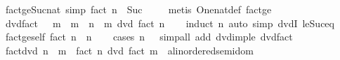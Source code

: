 \begin{isabellebody}
\endisatagproof
{\isafoldproof}%
%
\isadelimproof
\isanewline
%
\endisadelimproof
\isanewline
{}\isamarkupfalse%
\ fact{\isacharunderscore}{\kern0pt}ge{\isacharunderscore}{\kern0pt}Suc{\isacharunderscore}{\kern0pt}{}{\isacharunderscore}{\kern0pt}nat\ {\isacharbrackleft}{\kern0pt}simp{\isacharbrackright}{\kern0pt}{\isacharcolon}{\kern0pt}\ {\isachardoublequoteopen}fact\ n\ {\isasymge}\ Suc\ {}{\isachardoublequoteclose}\isanewline
%
\isadelimproof
\ \ %
\endisadelimproof
%
\isatagproof
{}\isamarkupfalse%
\ {\isacharparenleft}{\kern0pt}metis\ One{\isacharunderscore}{\kern0pt}nat{\isacharunderscore}{\kern0pt}def\ fact{\isacharunderscore}{\kern0pt}ge{\isacharunderscore}{\kern0pt}{}{\isacharparenright}{\kern0pt}%
\endisatagproof
{\isafoldproof}%
%
\isadelimproof
\isanewline
%
\endisadelimproof
\isanewline
{}\isamarkupfalse%
\ dvd{\isacharunderscore}{\kern0pt}fact{\isacharcolon}{\kern0pt}\ {\isachardoublequoteopen}{}\ {\isasymle}\ m\ {\isasymLongrightarrow}\ m\ {\isasymle}\ n\ {\isasymLongrightarrow}\ m\ dvd\ fact\ n{\isachardoublequoteclose}\isanewline
%
\isadelimproof
\ \ %
\endisadelimproof
%
\isatagproof
{}\isamarkupfalse%
\ {\isacharparenleft}{\kern0pt}induct\ n{\isacharparenright}{\kern0pt}\ {\isacharparenleft}{\kern0pt}auto\ simp{\isacharcolon}{\kern0pt}\ dvdI\ le{\isacharunderscore}{\kern0pt}Suc{\isacharunderscore}{\kern0pt}eq{\isacharparenright}{\kern0pt}%
\endisatagproof
{\isafoldproof}%
%
\isadelimproof
\isanewline
%
\endisadelimproof
\isanewline
{}\isamarkupfalse%
\ fact{\isacharunderscore}{\kern0pt}ge{\isacharunderscore}{\kern0pt}self{\isacharcolon}{\kern0pt}\ {\isachardoublequoteopen}fact\ n\ {\isasymge}\ n{\isachardoublequoteclose}\isanewline
%
\isadelimproof
\ \ %
\endisadelimproof
%
\isatagproof
{}\isamarkupfalse%
\ {\isacharparenleft}{\kern0pt}cases\ {\isachardoublequoteopen}n\ {\isacharequal}{\kern0pt}\ {}{\isachardoublequoteclose}{\isacharparenright}{\kern0pt}\ {\isacharparenleft}{\kern0pt}simp{\isacharunderscore}{\kern0pt}all\ add{\isacharcolon}{\kern0pt}\ dvd{\isacharunderscore}{\kern0pt}imp{\isacharunderscore}{\kern0pt}le\ dvd{\isacharunderscore}{\kern0pt}fact{\isacharparenright}{\kern0pt}%
\endisatagproof
{\isafoldproof}%
%
\isadelimproof
\isanewline
%
\endisadelimproof
\isanewline
{}\isamarkupfalse%
\ fact{\isacharunderscore}{\kern0pt}dvd{\isacharcolon}{\kern0pt}\ {\isachardoublequoteopen}n\ {\isasymle}\ m\ {\isasymLongrightarrow}\ fact\ n\ dvd\ {\isacharparenleft}{\kern0pt}fact\ m\ {\isacharcolon}{\kern0pt}{\isacharcolon}{\kern0pt}\ {\isacharprime}{\kern0pt}a{\isacharcolon}{\kern0pt}{\isacharcolon}{\kern0pt}linordered{\isacharunderscore}{\kern0pt}semidom{\isacharparenright}{\kern0pt}{\isachardoublequoteclose}\isanewline

\end{isabellebody}
